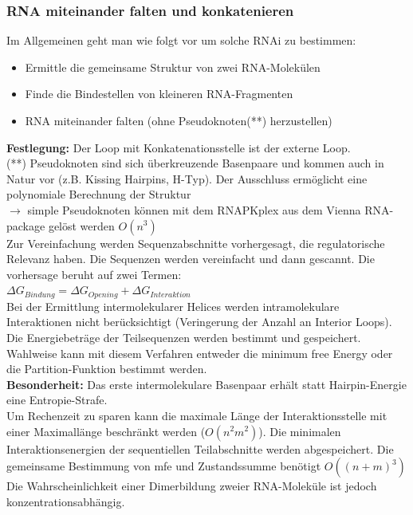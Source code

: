 \subsubsection{RNA miteinander falten und konkatenieren}

Im Allgemeinen geht man wie folgt vor um solche RNAi zu bestimmen:
\begin{itemize}
\item Ermittle die gemeinsame Struktur von zwei RNA-Molekülen
\item Finde die Bindestellen von kleineren RNA-Fragmenten
\item RNA miteinander falten (ohne Pseudoknoten(**) herzustellen)
\end{itemize}  
\textbf{Festlegung:} Der Loop mit Konkatenationsstelle ist der externe Loop. \\
(**) Pseudoknoten sind sich überkreuzende Basenpaare und kommen auch in Natur vor (z.B. Kissing Hairpins, H-Typ). Der Ausschluss ermöglicht eine polynomiale Berechnung der Struktur \\
$\rightarrow$ simple Pseudoknoten können mit dem RNAPKplex aus dem Vienna RNA-package gelöst werden $O(n^3)$ \\

Zur Vereinfachung werden Sequenzabschnitte vorhergesagt, die regulatorische Relevanz haben. Die Sequenzen werden vereinfacht und dann gescannt. Die vorhersage beruht auf zwei Termen:\\
$\Delta G_{Bindung} = \Delta G_{Opening} + \Delta G_{Interaktion}$\\
Bei der Ermittlung intermolekularer Helices werden intramolekulare Interaktionen nicht berücksichtigt (Veringerung der Anzahl an Interior Loops). Die Energiebeträge der Teilsequenzen werden bestimmt und gespeichert. Wahlweise kann mit diesem Verfahren entweder die minimum free Energy oder die Partition-Funktion bestimmt werden.\\
\textbf{Besonderheit:} Das erste intermolekulare Basenpaar erhält statt Hairpin-Energie eine Entropie-Strafe.\\
Um Rechenzeit zu sparen kann die maximale Länge der Interaktionsstelle mit einer Maximallänge beschränkt werden ($O(n^2m^2)$). Die minimalen Interaktionsenergien der sequentiellen Teilabschnitte werden abgespeichert. Die gemeinsame Bestimmung von mfe und Zustandssumme benötigt $O((n+m)^3)$\\ 
Die Wahrscheinlichkeit einer Dimerbildung zweier RNA-Moleküle ist jedoch konzentrationsabhängig.

